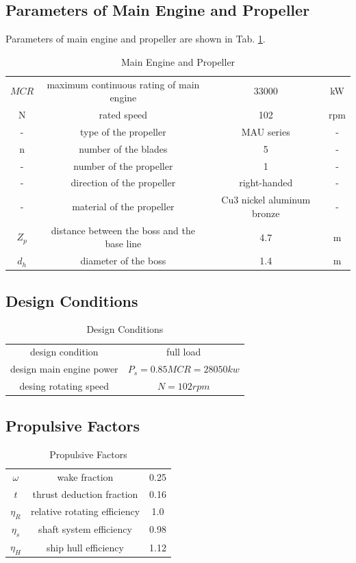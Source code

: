 \documentclass[a4paper,UTF8]{article}
\begin{document}
\subsection{Parameters of Main Engine and Propeller}
Parameters of main engine and propeller are shown in Tab. \ref{tab:mep}.
\begin{table}
	\centering
	\begin{tabular}{cccc}
		\hline
		$MCR$ & maximum continuous rating of main engine & 33000 & kW\\
		N  &  rated speed & 102 & rpm\\
		- & type of the propeller & MAU series & -\\
		n & number of the blades & 5 & -\\
		- & number of the propeller & 1 &-\\
		- & direction of the propeller & right-handed & -\\
		- & material of the propeller & Cu3 nickel aluminum bronze & -\\
		$Z_p$ & distance between the boss and the base line & 4.7 & m\\
		$d_h$ & diameter of the boss & 1.4 &m\\
		\hline 
	\end{tabular}
	\caption{Main Engine and Propeller}
	\label{tab:mep}
\end{table}
\subsection{Design Conditions}
 \begin{table}[!htbp]
 	\centering
 	\begin{tabular}{cc}
 		\hline
		 design condition & full load \\
		 design main engine power & $P_s=0.85MCR=28050kw$\\
		 desing rotating speed & $N=102rpm$\\
		 \hline
 	\end{tabular}
 	\caption{Design Conditions}
 \end{table}

\subsection{Propulsive Factors}
\begin{table}[!htbp]
	\centering
	\begin{tabular}{ccc}
		\hline
		$\omega$ & wake fraction & 0.25\\
		$t$		& thrust deduction fraction & 0.16\\
		$\eta_R$ & relative rotating efficiency & 1.0 \\
		$\eta_s$ & shaft system efficiency & 0.98\\
		$\eta_H$ & ship hull efficiency & 1.12\\
		\hline
	\end{tabular}
\caption{Propulsive Factors}
\end{table}
\end{document}
